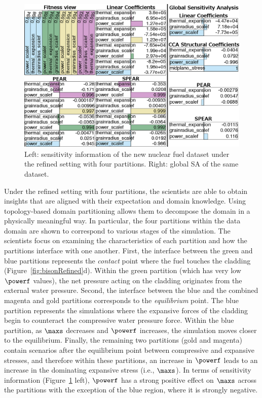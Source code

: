 \begin{figure}[t]
  \centering
  \includegraphics[width=\textwidth]{figs/chap6/bisonRefinedSensitivity2}
  \caption{
  Left: sensitivity information of the new nuclear fuel dataset under the refined setting with four partitions.
  Right: global SA of the same dataset.
  }
  \label{fig:bisonRefined_sensitivity}
\end{figure}

Under the refined setting with four partitions, the scientists are able to obtain insights that are aligned with their expectation and domain knowledge.
%
Using topology-based domain partitioning allows them to decompose the domain in a physically meaningful way.
%
In particular, the four partitions within the data domain are shown to correspond to various stages of the simulation.
%
The scientists focus on examining the characteristics of each partition and how the partitions interface with one another.
%
First, the interface between the green and blue partitions represents the \emph{contact} point where the fuel touches the cladding (Figure~\ref{fig:bisonRefined}d).
%
Within the green partition (which has very low $\powerf$ values), the net pressure acting on the cladding originates from the external water pressure.
%
Second, the interface between the blue and the combined magenta and gold partitions corresponds to the \emph{equilibrium} point.
%
The blue partition represents the simulations where the expansive forces of the cladding begin to counteract the compressive water pressure force.
%
Within the blue partition, as $\maxs$ decreases and $\powerf$ increases, the simulation moves closer to the equilibrium.
%
Finally, the remaining two partitions (gold and magenta) contain scenarios after the equilibrium point between compressive and expansive stresses, and therefore within these partitions, an increase in $\powerf$ leads to an increase in the dominating expansive stress (i.e., $\maxs$).
%
In terms of sensitivity information (Figure~\ref{fig:bisonRefined_sensitivity} left), $\powerf$ has a strong positive effect on $\maxs$ across the partitions with the exception of the blue region, where it is strongly negative.

